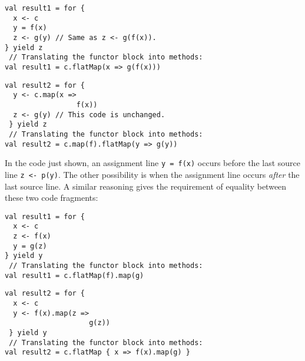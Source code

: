\noindent \texttt{\textcolor{blue}{\footnotesize{}}}%
\begin{minipage}[c]{0.475\columnwidth}%
\begin{lstlisting}
val result1 = for {
  x <- c
  y = f(x)
  z <- g(y) // Same as z <- g(f(x)).
} yield z
 // Translating the functor block into methods:
val result1 = c.flatMap(x => g(f(x)))
\end{lstlisting}
%
\end{minipage}\texttt{\textcolor{blue}{\footnotesize{}\hspace*{\fill}}}%
\begin{minipage}[c]{0.475\columnwidth}%
\begin{lstlisting}
val result2 = for {
  y <- c.map(x =>
                 f(x))
  z <- g(y) // This code is unchanged.
 } yield z
 // Translating the functor block into methods:
val result2 = c.map(f).flatMap(y => g(y))
\end{lstlisting}
%
\end{minipage}{\footnotesize\par}

\vspace{0\baselineskip}

In the code just shown, an assignment line \lstinline!y = f(x)! occurs
before the last source line \lstinline!z <- p(y)!. The other possibility
is when the assignment line occurs \emph{after} the last source line.
A similar reasoning gives the requirement of equality between these
two code fragments:

\vspace{0.3\baselineskip}

\noindent \texttt{\textcolor{blue}{\footnotesize{}}}%
\begin{minipage}[c]{0.475\columnwidth}%
\begin{lstlisting}
val result1 = for {
  x <- c
  z <- f(x)
  y = g(z)
} yield y
 // Translating the functor block into methods:
val result1 = c.flatMap(f).map(g)
\end{lstlisting}
%
\end{minipage}\texttt{\textcolor{blue}{\footnotesize{}\hspace*{\fill}}}%
\begin{minipage}[c]{0.475\columnwidth}%
\begin{lstlisting}
val result2 = for {
  x <- c
  y <- f(x).map(z =>
                    g(z))
 } yield y
 // Translating the functor block into methods:
val result2 = c.flatMap { x => f(x).map(g) }
\end{lstlisting}
%
\end{minipage}\vspace{0\baselineskip}

